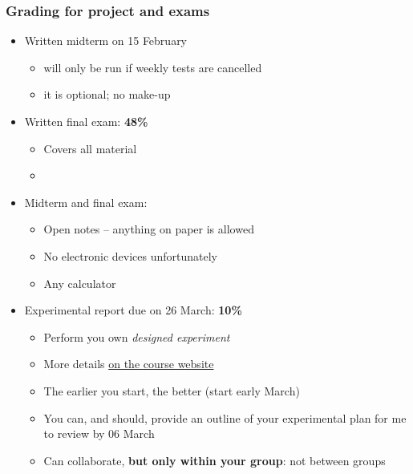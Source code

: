 \begin{frame}\frametitle{Grading for project and exams}
	\begin{itemize}
		\item	Written midterm on 15 February
		\begin{itemize}
			\item	will only be run if weekly tests are cancelled
			\item	it is optional; no make-up 
		\end{itemize}
	\end{itemize}
	\begin{itemize}
		\item	Written final exam: \textbf{48\%} 
		\begin{itemize}
			\item	Covers all material 
			\item	\textbf{{\color{myRed}{You must achieve 50\% or greater in final exam to pass 4C3/6C3}}}
		\end{itemize}
	\end{itemize}
	\begin{itemize}
		\item	Midterm and final exam: 
		\begin{itemize}
			\item	Open notes -- anything on paper is allowed 
			\item	No electronic devices unfortunately 
			\item	Any calculator 
		\end{itemize}
	\end{itemize}
	\begin{itemize}
		\item	Experimental report due on 26 March: \textbf{10\%} 
		\begin{itemize}
			\item	Perform you own \emph{designed experiment} 
			\item	More details \href{http://learnche.mcmaster.ca/4C3/Designed_experiments_project_-_2013}{on the course website}
			\item	The earlier you start, the better (start early March)
			\item	You can, and should, provide an outline of your experimental plan for me to review by 06 March 
			\item	Can collaborate, \textbf{but only within your group}: not between groups 
		\end{itemize}
	\end{itemize}
\end{frame}

